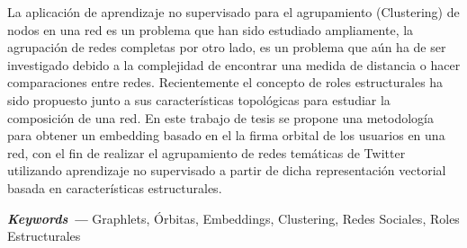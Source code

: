 \label{sec:abstract}

La aplicación de aprendizaje no supervisado para el agrupamiento (Clustering) de nodos en una red es un problema que han sido estudiado ampliamente, la agrupación de redes completas por otro lado, es un problema que aún ha de ser investigado debido a la complejidad de encontrar una medida de distancia o hacer comparaciones entre redes. Recientemente el concepto de roles estructurales ha sido propuesto junto a sus características topológicas para estudiar la composición de una red. En este trabajo de tesis se propone una metodología para obtener un embedding basado en el la firma orbital de los usuarios en una red, con el fin de realizar el agrupamiento de redes temáticas de Twitter utilizando aprendizaje no supervisado a partir de dicha representación vectorial basada en características estructurales.

{\vspace{5mm}\textbf{\textit{Keywords ---}} Graphlets, Órbitas, Embeddings, Clustering, Redes Sociales, Roles Estructurales} 